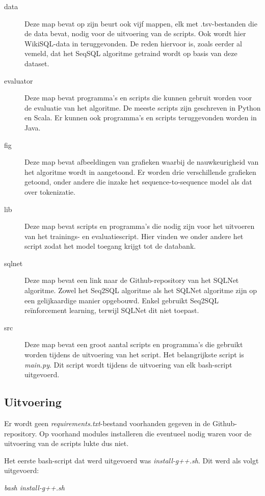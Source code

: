 \begin{description}
	\item[data] Deze map bevat op zijn beurt ook vijf mappen, elk met .tsv-bestanden die de data bevat, nodig voor de uitvoering van de scripts. Ook wordt hier WikiSQL-data in teruggevonden. De reden hiervoor is, zoals eerder al vemeld, dat het SeqSQL algoritme getraind wordt op basis van deze dataset.
	\item[evaluator] Deze map bevat programma's en scripts die kunnen gebruit worden voor de evaluatie van het algoritme. De meeste scripts zijn geschreven in Python en Scala. Er kunnen ook programma's en scripts teruggevonden worden in Java. 
	\item[fig] Deze map bevat afbeeldingen van grafieken waarbij de nauwkeurigheid van het algoritme wordt in aangetoond. Er worden drie verschillende grafieken getoond, onder andere die inzake het sequence-to-sequence model als dat over tokenizatie.
	\item[lib] Deze map bevat scripts en programma's die nodig zijn voor het uitvoeren van het trainings- en evaluatiescript. Hier vinden we onder andere het script zodat het model toegang krijgt tot de databank.
	\item[sqlnet] Deze map bevat een link naar de Github-repository van het SQLNet algoritme. Zowel het Seq2SQL algoritme als het SQLNet algoritme zijn op een gelijkaardige manier opgebouwd. Enkel gebruikt Seq2SQL reïnforcement learning, terwijl SQLNet dit niet toepast.
	\item[src] Deze map bevat een groot aantal scripts en programma's die gebruikt worden tijdens de uitvoering van het script. Het belangrijkste script is \textit{main.py}. Dit script wordt tijdens de uitvoering van elk bash-script uitgevoerd.
\end{description}

\subsection{Uitvoering}

Er wordt geen \textit{requirements.txt}-bestand voorhanden gegeven in de Github-repository. Op voorhand modules installeren die eventueel nodig waren voor de uitvoering van de scripts lukte dus niet. 

Het eerste bash-script dat werd uitgevoerd was \textit{install-g++.sh}. Dit werd als volgt uitgevoerd:

\begin{center}
	\textit{bash install-g++.sh}
\end{center}

